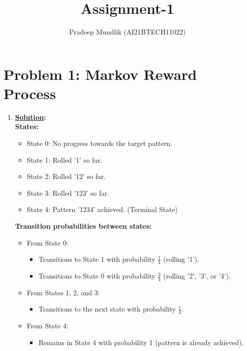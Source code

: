 \documentclass[12pt]{article}
\title{Assignment-1}
\author{Pradeep Mundlik (AI21BTECH11022)}
\newcommand{\solution}{\noindent \textbf{\underline{Solution}: }}
\begin{document}
\maketitle

\section*{Problem 1: Markov Reward Process}

\begin{enumerate}
    \item \solution \\ 
    \textbf{States:}
    \begin{itemize}
        \item State 0: No progress towards the target pattern.
        \item State 1: Rolled '1' so far.
        \item State 2: Rolled '12' so far.
        \item State 3: Rolled '123' so far.
        \item State 4: Pattern '1234' achieved. (Terminal State)
     \end{itemize}
    
    \textbf{Transition probabilities between states:}
    \begin{itemize}
        \item From State 0:
        \begin{itemize}
           \item Transitions to State 1 with probability $\frac{1}{4}$ (rolling '1').
           \item Transitions to State 0 with probability $\frac{3}{4}$ (rolling '2', '3', or '4').
        \end{itemize}
        
        \item From States 1, 2, and 3:
        \begin{itemize}
           \item Transitions to the next state with probability $\frac{1}{4}$.
        \end{itemize}
        
        \item From State 4:
        \begin{itemize}
           \item Remains in State 4 with probability 1 (pattern is already achieved).
        \end{itemize}
     \end{itemize}


\end{enumerate}
\end{document}
